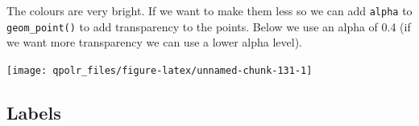\documentclass[12pt,oneside]{reedthesis}
\theoremstyle{definition}
\theoremstyle{definition}
\theoremstyle{definition}
\theoremstyle{remark}
\begin{document}
  The colours are very bright. If we want to make them less so we can add
  \texttt{alpha} to \texttt{geom\_point()} to add transparency to the
  points. Below we use an alpha of 0.4 (if we want more transparency we
  can use a lower alpha level).
  \begin{Shaded}
  \begin{Highlighting}[]
  \NormalTok{(}\OperatorTok{+}
  \StringTok{  }\NormalTok{(} \NormalTok{, }\NormalTok{) }\OperatorTok{+}\StringTok{ }
  \StringTok{  }\NormalTok{(}\NormalTok{, }\NormalTok{) }\OperatorTok{+}
  \StringTok{  }\NormalTok{(} \NormalTok{(}\NormalTok{, }\NormalTok{)) }\OperatorTok{+}
  \StringTok{  }\NormalTok{()}
  \end{Highlighting}
  \end{Shaded}
  \begin{center}\texttt{[image: qpolr\_files/figure-latex/unnamed-chunk-131-1]} \end{center}
  
  \subsection{Labels}\label{labels}
  
\end{document}
